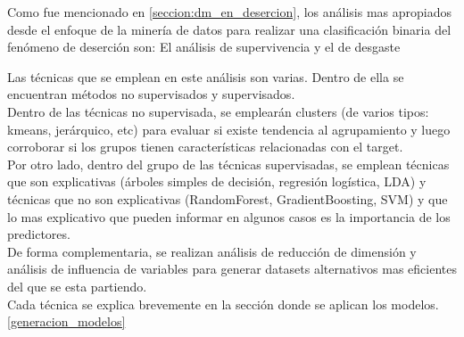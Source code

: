 

Como fue mencionado en \ref{seccion:dm_en_desercion}, los análisis mas apropiados desde el enfoque de la minería de datos para realizar una clasificación binaria del fenómeno de deserción son: El análisis de supervivencia y el de desgaste \cite{PredictModel-GarciaVellidoNebot}


Las técnicas que se emplean en este análisis son varias. Dentro de ella se encuentran métodos no supervisados y supervisados.\\
Dentro de las técnicas no supervisada, se emplearán clusters (de varios tipos: kmeans, jerárquico, etc) para evaluar si existe tendencia al agrupamiento y luego corroborar si los grupos tienen características relacionadas con el target. \\
Por otro lado, dentro del grupo de las técnicas supervisadas, se emplean técnicas que son explicativas (árboles simples de decisión, regresión logística, LDA) y técnicas que no son explicativas (RandomForest, GradientBoosting, SVM) y que lo mas explicativo que pueden informar en algunos casos es la importancia de los predictores.\\

De forma complementaria, se realizan análisis de reducción de dimensión y análisis de influencia de variables para generar datasets alternativos mas eficientes del que se esta partiendo.\\

Cada técnica se explica brevemente en la sección donde se aplican los modelos.\ref{generacion_modelos}

